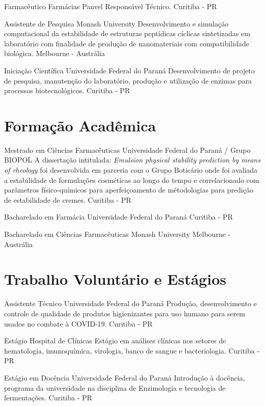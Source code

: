 {Farmacêutico}
{Farmácias Panvel}
{Responsável Técnico.}
{Curitiba - PR}

{Assistente de Pesquisa}
{Monash University}
{
	Desenvolvimento e simulação computacional da estabilidade 
	de estruturas peptídicas cíclicas sintetizadas em laboratório 
	com finalidade de produção de nanomateriais com compatibilidade biológica.
}
{Melbourne - Austrália}

{Iniciação Científica}
{Universidade Federal do Paraná}
{
	Desenvolvimento de projeto de pesquisa, 
	manutenção do laboratório, 
	produção e utilização de enzimas para processos biotecnológicos.
}
{Curitiba - PR}

\section{Formação Acadêmica}

{Mestrado em Ciências Farmacêuticas}
{Universidade Federal do Paraná / Grupo BIOPOL}
{
	A dissertação intitulada: \emph{Emulsion physical stability prediction by means of rheology}
	foi desenvolvida em parceria com o Grupo Boticário onde foi avaliada a estabilidade
	de formulações cosméticas ao longo do tempo e correlacionado com parâmetros 
	físico-químicos para aperfeiçoamento de métodologias para predição de estabilidade de cremes.
}
{Curitiba - PR}

{Bacharelado em Farmácia}
{Universidade Federal do Paraná}
{}
{Curitiba - PR}

{Bacharelado em Ciências Farmacêuticas}
{Monash University}
{}
{Melbourne - Austrália}

\section{Trabalho Voluntário e Estágios}

{Assistente Técnico}
{Universidade Federal do Paraná}
{
	Produção, desenvolvimento e controle de qualidade de produtos higienizantes 
	para uso humano para serem usados no combate à COVID-19.
}
{Curitiba - PR}

{Estágio}
{Hospital de Clínicas}
{
	Estágio em análises clínicas nos setores de hematologia, 
	imunoquímica, virologia, banco de sangue e bacteriologia.}
{}
{Curitiba - PR}

{Estágio em Docência}
{Universidade Federal do Paraná}
{
	Introdução à docência, programa da universidade 
	na disciplina de Enzimologia e tecnologia de fermentações.
}
{Curitiba - PR}

